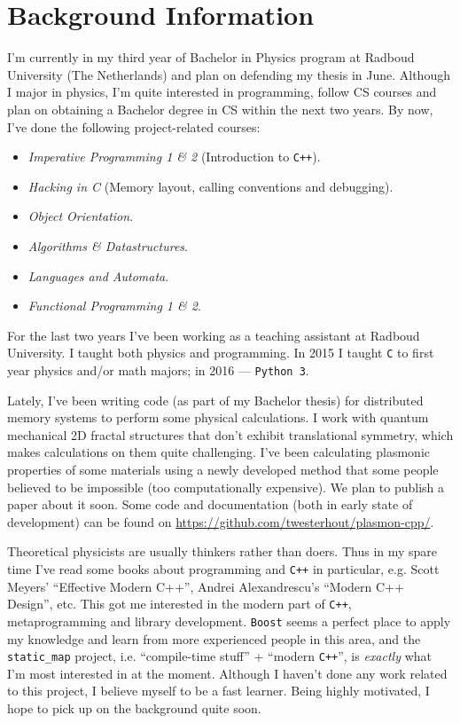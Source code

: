 \documentclass[a4paper,12pt]{article}
\begin{document}
\section{Background Information}
    I'm currently in my third year of Bachelor in Physics program at Radboud University (The Netherlands) and plan on defending my thesis in June. Although I major in physics, I'm quite interested in programming, follow CS courses and plan on obtaining a Bachelor degree in CS within the next two years. By now, I've done the following project-related courses:
    \begin{itemize}
    \item \textit{Imperative Programming 1 \& 2} (Introduction to \texttt{C++}).
    \item \textit{Hacking in C} (Memory layout, calling conventions and debugging). 
    \item \textit{Object Orientation}.
    \item \textit{Algorithms \& Datastructures}.
    \item \textit{Languages and Automata}.
    \item \textit{Functional Programming 1 \& 2}.
    \end{itemize}

    For the last two years I've been working as a teaching assistant at Radboud University. I taught both physics and programming. In 2015 I taught \texttt{C} to first year physics and/or math majors; in 2016 --- \texttt{Python 3}. 

    Lately, I've been writing code (as part of my Bachelor thesis) for distributed memory systems to perform some physical calculations. I work with quantum mechanical 2D fractal structures that don't exhibit translational symmetry, which makes calculations on them quite challenging. I've been calculating plasmonic properties of some materials using a newly developed method that some people believed to be impossible (too computationally expensive). We plan to publish a paper about it soon. Some code and documentation (both in early state of development) can be found on \url{https://github.com/twesterhout/plasmon-cpp/}.

    Theoretical physicists are usually thinkers rather than doers. Thus in my spare time I've read some books about programming and \texttt{C++} in particular, e.g. Scott Meyers' ``Effective Modern C++'', Andrei Alexandrescu's ``Modern C++ Design'', etc. This got me interested in the modern part of \texttt{C++}, metaprogramming and library development. \texttt{Boost} seems a perfect place to apply my knowledge and learn from more experienced people in this area, and the \texttt{static\_map} project, i.e. ``compile-time stuff'' + ``modern \texttt{C++}'', is \textit{exactly} what I'm most interested in at the moment. Although I haven't done any work related to this project, I believe myself to be a fast learner. Being highly motivated, I hope to pick up on the background quite soon. 
    
\end{document}
